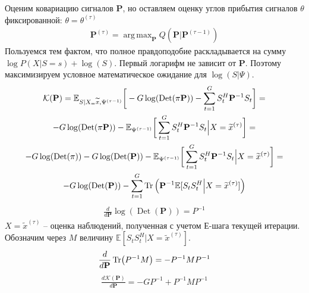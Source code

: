 \documentclass[11pt]{article}
\newcommand{\Expect}{\mathbb{E}}
\DeclareMathOperator*{\argmax}{arg \, \max}
\DeclareMathOperator{\Det}{Det}
\begin{document}
\begin{center}
\fontsize{14}{18}\selectfont {}
\end{center}
Оценим ковариацию сигналов $\mathbf{P}$, но оставляем оценку углов прибытия сигналов $\theta$ фиксированной: $\theta = \theta^{(\tau)}$
\begin{equation*}
\begin{gathered}
\mathbf{P}^{(\tau)}= \argmax_{\mathbf{P}} Q(\mathbf{P} | \mathbf{P}^{(\tau-1)}) 
\end{gathered}
\end{equation*}
Пользуемся тем фактом, что полное правдоподобие раскладывается на сумму $\log P(X|S=s) + \log(S)$. Первый логарифм не зависит от $\mathbf{P}$. Поэтому максимизируем условное математическое ожидание  для $\log(S| \Psi)$.
\begin{equation*}
\begin{gathered}
\mathcal{K}(\mathbf{P}) = \Expect_{S|X_=\widetilde{x}, \Psi^{(\tau-1)}}\bigg[- G \log(\Det(\pi \mathbf{P})) - \sum_{t=1}^G S_t^H \mathbf{P}^{-1}S_t\bigg] = \\
- G \log(\Det(\pi \mathbf{P})) - \Expect_{\Psi^{(\tau-1)}}\bigg[ \sum_{t=1}^G S_t^H \mathbf{P}^{-1}S_t \Big | X = \widetilde{x}^{(\tau)} \bigg ] = \\
- G \log(\Det(\pi)) - G \log(\Det(\mathbf{P})) - \Expect_{\Psi^{(\tau-1)}}\bigg[ \sum_{t=1}^G S_t^H \mathbf{P}^{-1}S_t \Big | X = \widetilde{x}^{(\tau)} \bigg ] = \\
 - G \log(\Det(\mathbf{P})) - \sum_{t=1}^G \Tr\Big(\mathbf{P}^{-1} \Expect[S_t S_t^H\Big| X = \widetilde{x}^{(\tau)}]\Big)
\end{gathered}
\end{equation*}
\begin{equation*}
\begin{gathered}
\frac{d}{d\mathbf{P}}\log (\Det (\mathbf{P})) = P^{-1}
\end{gathered}
\end{equation*}
$X = \widetilde{x}^{(\tau)}$ -- оценка наблюдений, полученная с учетом Е-шага текущей итерации.
Обозначим через $M$ величину $\Expect[S_t S_t^H\Big| X = \widetilde{x}^{(\tau)}]$.
\begin{equation*}
\begin{gathered}
\frac{d}{d\mathbf{P}}\Tr(P^{-1}M)= -P^{-1}MP^{-1}
\end{gathered}
\end{equation*}
\begin{equation*}
\begin{gathered}
\frac{d\mathcal{K}(\mathbf{P})}{d\mathbf{P}} = -GP^{-1}+P^{-1}MP^{-1}
\end{gathered}
\end{equation*}
\end{document}
